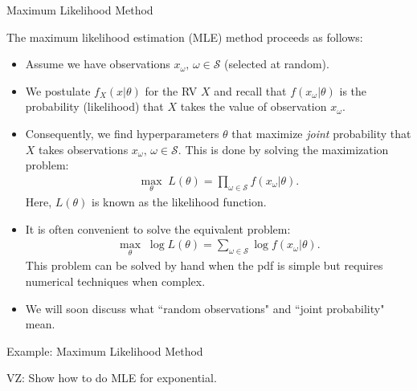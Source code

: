 \documentclass[9pt]{beamer}
\begin{document}
%
\begin{frame}{Maximum Likelihood Method}

The maximum likelihood estimation (MLE) method proceeds as follows:

\begin{itemize}
\item Assume we have observations $x_\omega,\, \omega \in \mathcal{S}$ (selected at random).
\item We postulate $f_X(x|\theta)$ for the RV $X$ and recall that $f(x_\omega|\theta)$ is the probability (likelihood) that $X$ takes the value of observation $x_\omega$.  

\item Consequently, we find hyperparameters $\theta$ that maximize {\em joint} probability that $X$ takes observations $x_\omega,\,\omega \in \mathcal{S}$. This is done by solving the maximization problem:
\begin{align*}
\max_\theta\; L(\theta)=\prod_{\omega \in \mathcal{S}}f(x_\omega|\theta).
\end{align*}
Here, $L(\theta)$ is known as the likelihood function. 

\item It is often convenient to solve the equivalent problem:
\begin{align*}
\max_\theta\; \log L(\theta)=\sum_{\omega \in \mathcal{S}}\log f(x_\omega|\theta).
\end{align*}
This problem can be solved by hand when the pdf is simple but requires numerical techniques when complex. 
\item We will soon discuss what ``random observations" and ``joint probability" mean. 
\end{itemize}

\end{frame}


%
\begin{frame}{Example: Maximum Likelihood Method}

\begin{block}{}
{\color{red} VZ: Show how to do MLE for exponential.}
\end{block}

\end{frame}
\end{document}
